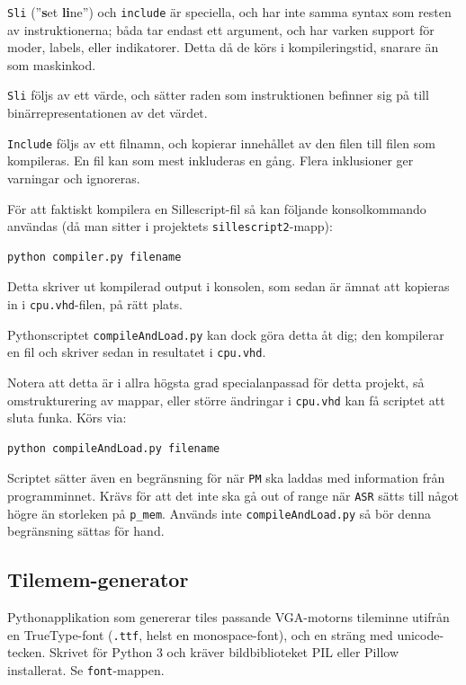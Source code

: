 \documentclass[]{article}
\begin{document}
\noindent
\texttt{Sli} (''\textbf{s}et \textbf{li}ne'') och \texttt{include} är speciella, och har inte samma syntax som resten av instruktionerna; båda tar endast ett argument, och har varken support för moder, labels, eller indikatorer. Detta då de körs i kompileringstid, snarare än som maskinkod.

\texttt{Sli} följs av ett värde, och sätter raden som instruktionen befinner sig på till binärrepresentationen av det värdet.

\texttt{Include} följs av ett filnamn, och kopierar innehållet av den filen till filen som kompileras. En fil kan som mest inkluderas en gång. Flera inklusioner ger varningar och ignoreras.

För att faktiskt kompilera en Sillescript-fil så kan följande konsolkommando användas (då man sitter i projektets \texttt{sillescript2}-mapp):\\

\begin{Verbatim}[frame=single]
python compiler.py filename
\end{Verbatim}

\noindent
Detta skriver ut kompilerad output i konsolen, som sedan är ämnat att kopieras in i \texttt{cpu.vhd}-filen, på rätt plats. 

Pythonscriptet \texttt{compileAndLoad.py} kan dock göra detta åt dig; den kompilerar en fil och skriver sedan in resultatet i \texttt{cpu.vhd}. 

Notera att detta är i allra högsta grad specialanpassad för detta projekt, så omstrukturering av mappar, eller större ändringar i \texttt{cpu.vhd} kan få scriptet att sluta funka. Körs via:\\

\begin{Verbatim}[frame=single]
python compileAndLoad.py filename
\end{Verbatim}

\noindent
Scriptet sätter även en begränsning för när \texttt{PM} ska laddas med information från programminnet. Krävs för att det inte ska gå out of range när \texttt{ASR} sätts till något högre än storleken på \texttt{p\_mem}. Används inte \texttt{compileAndLoad.py} så bör denna begränsning sättas för hand.

\subsection{Tilemem-generator}
Pythonapplikation som genererar tiles passande VGA-motorns tileminne utifrån en TrueType-font (\texttt{.ttf}, helst en monospace-font), och en sträng med unicode-tecken. Skrivet för Python 3 och kräver bildbiblioteket PIL eller Pillow installerat. Se \texttt{font}-mappen.
\end{document}
